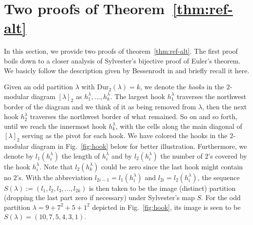 \documentclass[11pt,reqno]{amsart}
\numberwithin{equation}{section}
\theoremstyle{plain}
\theoremstyle{definition}
\theoremstyle{named}
\def\la{\lambda}
\def\Dur{\mathrm{Dur}}
\begin{document}
\section{Two proofs of Theorem~\ref{thm:ref-alt}}\label{sec:pf thm2}

In this section, we provide two proofs of theorem~\ref{thm:ref-alt}. The first proof boils down to a closer analysis of Sylvester's bijective proof of Euler's theorem. We basicly follow the description given by Bessenrodt in \cite{bes94} and briefly recall it here. 

Given an odd partition $\la$ with $\Dur_2(\la)=k$, we denote the {\it hooks} in the $2$-modular diagram $[\la]_2$ as $h_1^{\la},\ldots,h_k^{\la}$. The largest hook $h_1^{\la}$ traverses the northwest border of the diagram and we think of it as being removed from $\la$, then the next hook $h_2^{\la}$ traverses the northwest border of what remained. So on and so forth, until we reach the innermost hook $h_k^{\la}$, with the cells along the main diagonal of $[\la]_2$ serving as the pivot for each hook. We have colored the hooks in the $2$-modular diagram in Fig.~\ref{fig:hook} below for better illustration. Furthermore, we denote by $l_1(h_i^{\la})$ the length of $h_i^{\la}$ and by $l_2(h_i^{\la})$ the number of $2$'s covered by the hook $h_i^{\la}$. Note that $l_2(h_k^{\la})$ could be zero since the last hook might contain no $2$'s. With the abbreviation $l_{2i-1}=l_1(h_i^{\la})$ and $l_{2i}=l_2(h_i^{\la})$, the sequence $S(\la):=(l_1,l_2,l_3,\ldots,l_{2k})$ is then taken to be the image (distinct) partition (dropping the last part zero if necessary) under Sylvester's map $S$. For the odd partition $\la=9+7^2+5+1^2$ depicted in Fig.~\ref{fig:hook}, its image is seen to be $S(\la)=(10,7,5,4,3,1)$.
\end{document}
